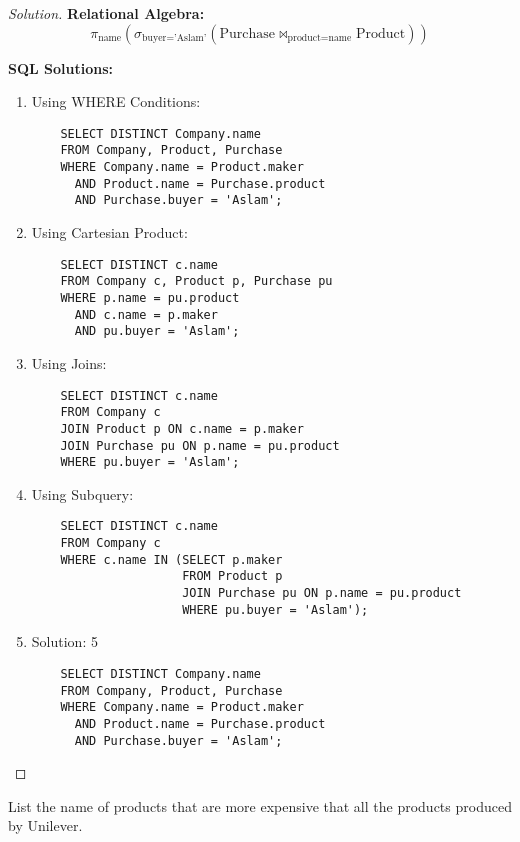 \documentclass[10pt]{article}
\newenvironment{problem}[2][Problem]{\begin{trivlist}
\item[\hskip \labelsep {\bfseries #1}\hskip \labelsep {\bfseries #2.}]}{\end{trivlist}}
\begin{document}
\begin{proof}[Solution]
\textbf{Relational Algebra:}
\[
\pi_{\text{name}}\left(\sigma_{\text{buyer} = \text{'Aslam'}}(\text{Purchase} \bowtie_{\text{product} = \text{name}} \text{Product})\right)
\]

\textbf{SQL Solutions:}
\begin{enumerate}

    \item Using WHERE Conditions:
    \begin{verbatim}
    SELECT DISTINCT Company.name
    FROM Company, Product, Purchase
    WHERE Company.name = Product.maker
      AND Product.name = Purchase.product
      AND Purchase.buyer = 'Aslam';
    \end{verbatim}
    \item Using Cartesian Product:
    \begin{verbatim}
    SELECT DISTINCT c.name
    FROM Company c, Product p, Purchase pu
    WHERE p.name = pu.product
      AND c.name = p.maker
      AND pu.buyer = 'Aslam';
    \end{verbatim}
    
    \item Using Joins:
    \begin{verbatim}
    SELECT DISTINCT c.name
    FROM Company c
    JOIN Product p ON c.name = p.maker
    JOIN Purchase pu ON p.name = pu.product
    WHERE pu.buyer = 'Aslam';
    \end{verbatim}
    
    \item Using Subquery:
    \begin{verbatim}
    SELECT DISTINCT c.name
    FROM Company c
    WHERE c.name IN (SELECT p.maker
                     FROM Product p
                     JOIN Purchase pu ON p.name = pu.product
                     WHERE pu.buyer = 'Aslam');
    \end{verbatim}
    \usepackage[margin=1in]{geometry}
    \item Solution: 5
    \begin{verbatim}
    SELECT DISTINCT Company.name
    FROM Company, Product, Purchase
    WHERE Company.name = Product.maker
      AND Product.name = Purchase.product
      AND Purchase.buyer = 'Aslam';
    \end{verbatim}
\end{enumerate}
\end{proof}


\begin{problem}{3}
List the name of products that are more expensive that all the products produced by Unilever.
\end{problem}
\end{document}

